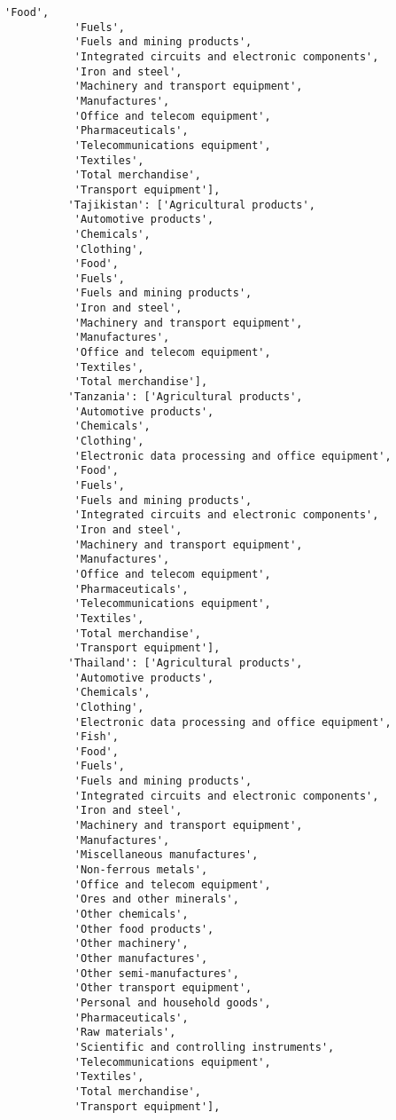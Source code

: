 \documentclass[11pt]{article}
\begin{document}
\begin{Verbatim}[commandchars=\\\{\}]
           'Food',
           'Fuels',
           'Fuels and mining products',
           'Integrated circuits and electronic components',
           'Iron and steel',
           'Machinery and transport equipment',
           'Manufactures',
           'Office and telecom equipment',
           'Pharmaceuticals',
           'Telecommunications equipment',
           'Textiles',
           'Total merchandise',
           'Transport equipment'],
          'Tajikistan': ['Agricultural products',
           'Automotive products',
           'Chemicals',
           'Clothing',
           'Food',
           'Fuels',
           'Fuels and mining products',
           'Iron and steel',
           'Machinery and transport equipment',
           'Manufactures',
           'Office and telecom equipment',
           'Textiles',
           'Total merchandise'],
          'Tanzania': ['Agricultural products',
           'Automotive products',
           'Chemicals',
           'Clothing',
           'Electronic data processing and office equipment',
           'Food',
           'Fuels',
           'Fuels and mining products',
           'Integrated circuits and electronic components',
           'Iron and steel',
           'Machinery and transport equipment',
           'Manufactures',
           'Office and telecom equipment',
           'Pharmaceuticals',
           'Telecommunications equipment',
           'Textiles',
           'Total merchandise',
           'Transport equipment'],
          'Thailand': ['Agricultural products',
           'Automotive products',
           'Chemicals',
           'Clothing',
           'Electronic data processing and office equipment',
           'Fish',
           'Food',
           'Fuels',
           'Fuels and mining products',
           'Integrated circuits and electronic components',
           'Iron and steel',
           'Machinery and transport equipment',
           'Manufactures',
           'Miscellaneous manufactures',
           'Non-ferrous metals',
           'Office and telecom equipment',
           'Ores and other minerals',
           'Other chemicals',
           'Other food products',
           'Other machinery',
           'Other manufactures',
           'Other semi-manufactures',
           'Other transport equipment',
           'Personal and household goods',
           'Pharmaceuticals',
           'Raw materials',
           'Scientific and controlling instruments',
           'Telecommunications equipment',
           'Textiles',
           'Total merchandise',
           'Transport equipment'],

\end{Verbatim}
\end{document}
